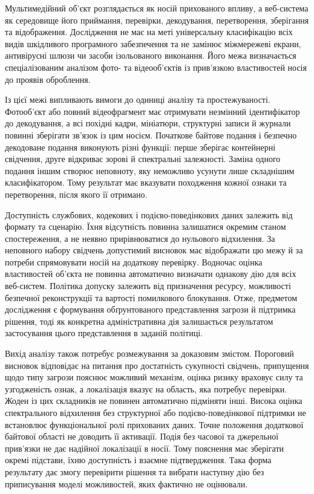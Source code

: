 Мультимедійний об’єкт розглядається як носій прихованого впливу, а веб-система як середовище його приймання, перевірки, декодування, перетворення, зберігання та відображення. Дослідження не має на меті універсальну класифікацію всіх видів шкідливого програмного забезпечення та не замінює міжмережеві екрани, антивірусні шлюзи чи засоби ізольованого виконання. Його межа визначається спеціалізованим аналізом фото- та відеооб’єктів із прив’язкою властивостей носія до проявів оброблення.

Із цієї межі випливають вимоги до одиниці аналізу та простежуваності. Фотооб’єкт або повний відеофрагмент має отримувати незмінний ідентифікатор до декодування, а всі похідні кадри, мініатюри, структурні записи й журнали повинні зберігати зв’язок із цим носієм. Початкове байтове подання і безпечно декодоване подання виконують різні функції: перше зберігає контейнерні свідчення, друге відкриває зорові й спектральні залежності. Заміна одного подання іншим створює неповноту, яку неможливо усунути лише складнішим класифікатором. Тому результат має вказувати походження кожної ознаки та перетворення, після якого її отримано.

Доступність службових, кодекових і подієво-поведінкових даних залежить від формату та сценарію. Їхня відсутність повинна залишатися окремим станом спостереження, а не неявно прирівнюватися до нульового відхилення. За неповного набору свідчень допустимий висновок має відображати цю межу й за потреби спрямовувати носій на додаткову перевірку. Водночас оцінка властивостей об’єкта не повинна автоматично визначати однакову дію для всіх веб-систем. Політика допуску залежить від призначення ресурсу, можливості безпечної реконструкції та вартості помилкового блокування. Отже, предметом дослідження є формування обґрунтованого представлення загрози й підтримка рішення, тоді як конкретна адміністративна дія залишається результатом застосування цього представлення в заданій політиці.

Вихід аналізу також потребує розмежування за доказовим змістом. Пороговий висновок відповідає на питання про достатність сукупності свідчень, припущення щодо типу загрози пояснює можливий механізм, оцінка ризику враховує силу та узгодженість ознак, а локалізація вказує на область, яка потребує перевірки. Жоден із цих складників не повинен автоматично підміняти інші. Висока оцінка спектрального відхилення без структурної або подієво-поведінкової підтримки не встановлює функціональної ролі прихованих даних. Точне положення додаткової байтової області не доводить її активації. Подія без часової та джерельної прив’язки не дає надійної локалізації в носії. Тому пояснення має зберігати окремі підстави, їхню доступність і взаємне підтвердження. Така форма результату дає змогу перевірити рішення та вибрати наступну дію без приписування моделі можливостей, яких фактично не оцінювали.

